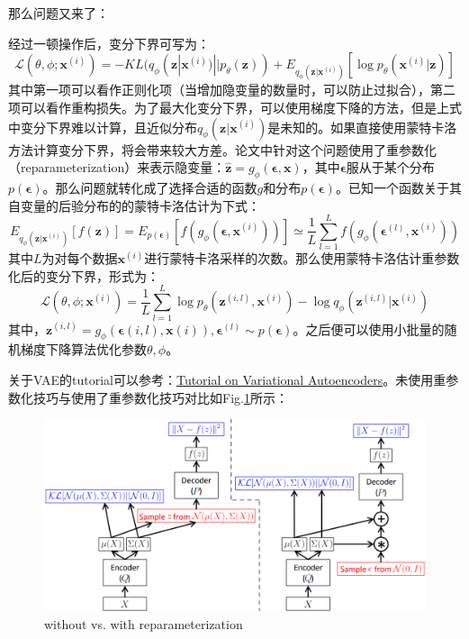 那么问题又来了：

经过一顿操作后，变分下界可写为：
$$\mathcal{L}(\theta, \phi; \boldsymbol{x}^{(i)}) = -KL(q_{\phi}(\boldsymbol{z}|\boldsymbol{x}^{(i)})||p_{\theta}(\boldsymbol{z})) + E_{q_{\phi}(\boldsymbol{z}|\boldsymbol{x}^{(i)})}[\log p_{\theta}(\boldsymbol{x}^{(i)}|\boldsymbol{z})]
$$
其中第一项可以看作正则化项（当增加隐变量的数量时，可以防止过拟合），第二项可以看作重构损失。为了最大化变分下界，可以使用梯度下降的方法，但是上式中变分下界难以计算，且近似分布$q_{\phi}(\boldsymbol{z}|\boldsymbol{x}^{(i)})$是未知的。如果直接使用蒙特卡洛方法计算变分下界，将会带来较大方差。论文中针对这个问题使用了重参数化（reparameterization）来表示隐变量：$\hat{\boldsymbol{z}} = g_{\phi}(\boldsymbol{\epsilon}, \boldsymbol{x})$，其中$\boldsymbol{\epsilon}$服从于某个分布$p(\boldsymbol{\epsilon})$。那么问题就转化成了选择合适的函数$g$和分布$p(\boldsymbol{\epsilon})$。已知一个函数关于其自变量的后验分布的的蒙特卡洛估计为下式：
$$
E_{q_{\phi}(\boldsymbol{z}|\boldsymbol{x}^{(i)})}[f(\boldsymbol{z})] = E_{p(\boldsymbol{\epsilon})}[f(g_{\phi}(\boldsymbol{\epsilon}, \boldsymbol{x}^{(i)} ) ) ] \simeq \frac{1}{L} \sum_{l=1}^{L} f(g_{\phi}(\boldsymbol{\epsilon}^{(l)}, \boldsymbol{x}^{(i)} ) )
$$
其中$L$为对每个数据$\boldsymbol{x}^{(i)}$进行蒙特卡洛采样的次数。那么使用蒙特卡洛估计重参数化后的变分下界，形式为：
$$
\mathcal{L}(\theta, \phi; \boldsymbol{x}^{(i)}) =  \frac{1}{L} \sum_{l=1}^{L} \log p_{\theta}(\boldsymbol{z}^{(i, l)},\boldsymbol{x}^{(i)}) - \log q_{\phi}(\boldsymbol{z}^{(i, l)}|\boldsymbol{x}^{(i)})
$$
其中，$\boldsymbol{z}^{(i, l)}=g_{\phi}(\boldsymbol{\epsilon}{(i, l)}, \boldsymbol{x}{(i)}), \boldsymbol{\epsilon}^{(l)} \sim p(\boldsymbol{\epsilon})$。之后便可以使用小批量的随机梯度下降算法优化参数$\theta, \phi$。

关于VAE的tutorial可以参考：\href{https://arxiv.org/pdf/1606.05908.pdf}{Tutorial on Variational Autoencoders}。未使用重参数化技巧与使用了重参数化技巧对比如Fig.\ref{fig:vae_rp}\cite{doersch2016tutorial}所示：
\begin{figure}[h]
	\centering
	\includegraphics[width=.8\textwidth]{pics/vae_rp.png}
	\caption{without vs. with reparameterization}
	\label{fig:vae_rp}
\end{figure}

